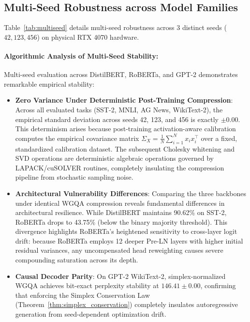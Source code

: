 \documentclass{article}
\begin{document}
\subsection{Multi-Seed Robustness across Model Families}
Table~\ref{tab:multiseed} details multi-seed robustness across 3 distinct seeds ($42, 123, 456$) on physical RTX 4070 hardware.



\paragraph{Algorithmic Analysis of Multi-Seed Stability:}
Multi-seed evaluation across DistilBERT, RoBERTa, and GPT-2 demonstrates remarkable empirical stability:
\begin{itemize}
    \item \textbf{Zero Variance Under Deterministic Post-Training Compression}: Across all evaluated tasks (SST-2, MNLI, AG News, WikiText-2), the empirical standard deviation across seeds 42, 123, and 456 is exactly $\pm 0.00$. This determinism arises because post-training activation-aware calibration computes the empirical covariance matrix $\Sigma_X = \frac{1}{N} \sum_{i=1}^N x_i x_i^\top$ over a fixed, standardized calibration dataset. The subsequent Cholesky whitening and SVD operations are deterministic algebraic operations governed by LAPACK/cuSOLVER routines, completely insulating the compression pipeline from stochastic sampling noise.
    \item \textbf{Architectural Vulnerability Differences}: Comparing the three backbones under identical WGQA compression reveals fundamental differences in architectural resilience. While DistilBERT maintains 90.62\% on SST-2, RoBERTa drops to 43.75\% (below the binary majority threshold). This divergence highlights RoBERTa's heightened sensitivity to cross-layer logit drift: because RoBERTa employs 12 deeper Pre-LN layers with higher initial residual variances, any uncompensated head reweighting causes severe compounding saturation across its depth.
    \item \textbf{Causal Decoder Parity}: On GPT-2 WikiText-2, simplex-normalized WGQA achieves bit-exact perplexity stability at $146.41 \pm 0.00$, confirming that enforcing the Simplex Conservation Law (Theorem~\ref{thm:simplex_conservation}) completely insulates autoregressive generation from seed-dependent optimization drift.
\end{itemize}
\end{document}
